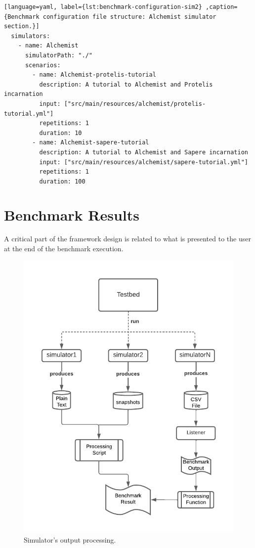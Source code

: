 \documentclass[12pt,a4paper,openright,twoside]{book}
\begin{document}
\begin{lstlisting}[language=yaml, label={lst:benchmark-configuration-sim2} ,caption={Benchmark configuration file structure: Alchemist simulator section.}]
  simulators:
    - name: Alchemist
      simulatorPath: "./"
      scenarios:
        - name: Alchemist-protelis-tutorial
          description: A tutorial to Alchemist and Protelis incarnation
          input: ["src/main/resources/alchemist/protelis-tutorial.yml"]
          repetitions: 1
          duration: 10
        - name: Alchemist-sapere-tutorial
          description: A tutorial to Alchemist and Sapere incarnation
          input: ["src/main/resources/alchemist/sapere-tutorial.yml"]
          repetitions: 1
          duration: 100
  \end{lstlisting}

\section{Benchmark Results}

A critical part of the framework design is related to what is presented to the user at the end of the benchmark execution.

\begin{figure}[h!]
  \centering
  \includegraphics[width=\textwidth]{figures/output-processing.pdf}
  \caption{Simulator's output processing.}
  \label{fig:output}
\end{figure}
\end{document}
